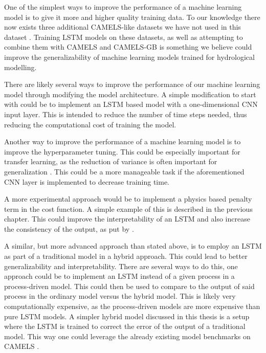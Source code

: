 One of the simplest ways to improve the performance of a machine learning model is to give 
it more and higher quality training data. To our knowledge there now exists three 
additional CAMELS-like datasets we have not used in this dataset \citep{CAMELS_CL, CAMELS_AU, CAMELS_BR}.
Training LSTM models on these datasets, as well as attempting to combine them with 
CAMELS and CAMELS-GB is something we believe could improve the generalizability of 
machine learning models trained for hydrological modelling.

There are likely several ways to improve the performance of our machine learning 
model through modifying the model architecture. A simple modification to start with 
could be to implement an LSTM based model with a one-dimensional CNN input layer. 
This is intended to reduce the number of time steps needed, thus reducing the 
computational cost of training the model.

Another way to improve the performance of a machine learning model is to improve 
the hyperparameter tuning. This could be especially important 
for transfer learning, as the reduction of variance is often important for 
generalization \citep{elemstatlearn}. This could be a more manageable task if 
the aforementioned CNN layer is implemented to decrease training time.

A more experimental approach would be to implement a physics based penalty term 
in the cost function. A simple example of 
this is described in the previous chapter. This could improve the interpretability 
of an LSTM and also increase the consistency of the output, as put by \citet{hybrid_paper}.

A similar, but more advanced approach than stated above, is to employ an LSTM as 
part of a traditional model in a hybrid approach. This could lead to better generalizability and 
interpretability. There are several ways to do this, one approach could be to implement 
an LSTM instead of a given process in a process-driven model. This could 
then be used to compare to the output of said process in the ordinary model versus 
the hybrid model. This is likely very computationally expensive, as the process-driven 
models are more expensive than pure LSTM models. A simpler hybrid model discussed 
in this thesis is a setup where the LSTM is trained to correct the error of 
the output of a traditional model. This way one could leverage the already existing 
model benchmarks on CAMELS \citep{CAMELS_hydroshare}.

\begin{comment}
One should also look into the possibility of implementing LSTM models in Statkraft's 
Shyft\citep{Shyft}, making it much easier to employ these models on many datasets, 
as well as greatly simplifying the process of comparing with other models.
\end{comment}
